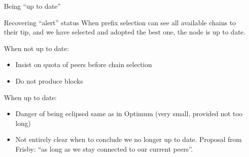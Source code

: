 \documentclass[usenames,dvipsnames,t]{beamer}
\begin{document}
\begin{frame}{Being ``up to date''}

\begin{alertblock}{Recovering ``alert'' status}
When prefix selection can see all available chains to their tip, and we have
selected and adopted the best one, the node is up to date.
\end{alertblock}

\pause

When not up to date:

\begin{itemize}

\item Insist on quota of peers before chain selection

\item Do not produce blocks

\end{itemize}

\pause

When up to date:

\begin{itemize}

\item Danger of being eclipsed same as in Optimum (very small, provided not too long)

\item Not entirely clear when to conclude we no longer up to date. Proposal from Frisby: ``as long as we stay connected to our current peers''.

\end{itemize}

\end{frame}
\end{document}
